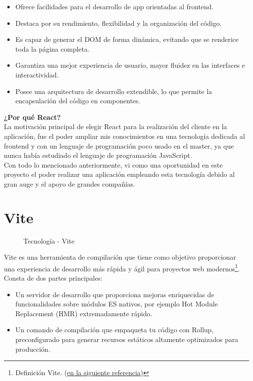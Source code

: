 \begin{itemize}

\item Ofrece facilidades para el desarrollo de app orientadas al frontend.
\item Destaca por su rendimiento, flexibilidad y la organización del código.
\item Es capaz de generar el DOM de forma dinámica, evitando que se renderice toda la página completa.
\item Garantiza una mejor experiencia de usuario, mayor fluidez en las interfaces e interactividad.
\item Posee una arquitectura de desarrollo extendible, lo que permite la encapsulación del código en componentes.

\end{itemize}

\textbf{¿Por qué React?}\\
La motivación principal de elegir React para la realización del cliente en la aplicación, fue el poder ampliar mis conocimientos en una tecnología dedicada al frontend y con un lenguaje de programación poco usado en el master, ya que nunca había estudiado el lenguaje de programación JavaScript.\\
Con todo lo mencionado anteriormente, vi como una oportunidad en este proyecto el poder realizar una aplicación empleando esta tecnología debido al gran auge y el apoyo de grandes compañías.\\

\newpage

\section{Vite}

\begin{figure}[h]
\centering
 \caption{Tecnología - Vite}
\end{figure}

Vite es una herramienta de compilación que tiene como objetivo proporcionar una experiencia de desarrollo más rápida y ágil para proyectos web modernos\footnote{Definición Vite. (\href{https://es.vitejs.dev/guide/}{en la siguiente referencia})}. Consta de dos partes principales:

\begin{itemize}

\item Un servidor de desarrollo que proporciona mejoras enriquecidas de funcionalidades sobre módulos ES nativos, por ejemplo Hot Module Replacement (HMR) extremadamente rápido.
\item Un comando de compilación que empaqueta tu código con Rollup, preconfigurado para generar recursos estáticos altamente optimizados para producción.

\end{itemize}

